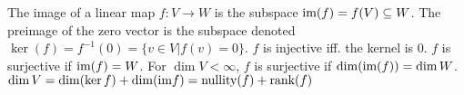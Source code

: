  The image of a linear map $f : V \to W$ is the subspace $\text{im}(f) = f(V) \subseteq W$. The preimage of the zero vector is the subspace denoted $\ker(f) = f^{-1}(0) = \{v \in V | f(v)=0\}$.
 $f$ is injective iff. the kernel is 0. $f$ is surjective if $\text{im}(f) = W$. For $\dim V < \infty$, $f$ is surjective if  $\dim(\text{im}(f)) = \dim W$.
 $\dim V = \dim(\ker f) + \dim(\text{im} f) = \text{nullity}(f) + \text{rank}(f)$
